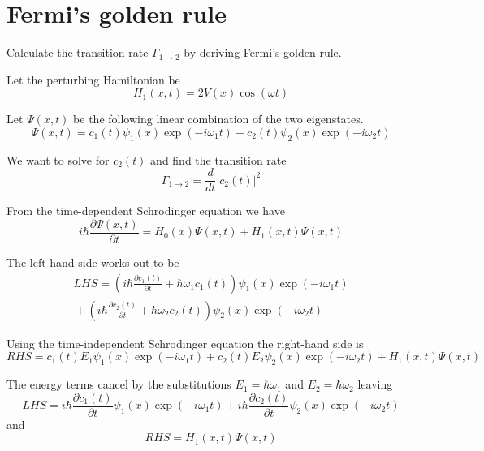 \documentclass[12pt]{article}
\begin{document}
\section*{Fermi's golden rule}

Calculate the transition rate $\Gamma_{1\rightarrow2}$
by deriving Fermi's golden rule.

\bigskip

Let the perturbing Hamiltonian be
\begin{equation*}
H_1(x,t)=2V(x)\cos(\omega t)
\end{equation*}

Let $\Psi(x,t)$ be the following linear combination of the two eigenstates.
\begin{equation*}
\Psi(x,t)=c_1(t)\psi_1(x)\exp(-i\omega_1t)+c_2(t)\psi_2(x)\exp(-i\omega_2t)
\end{equation*}

We want to solve for $c_2(t)$ and find the transition rate
\begin{equation*}
\Gamma_{1\rightarrow2}=\frac{d}{dt}|c_2(t)|^2
\end{equation*}

From the time-dependent Schrodinger equation we have
\begin{equation*}
i\hbar\frac{\partial\Psi(x,t)}{\partial t}=H_0(x)\Psi(x,t)+H_1(x,t)\Psi(x,t)
\end{equation*}

The left-hand side works out to be
\begin{multline*}
LHS=\left(i\hbar\frac{\partial c_1(t)}{\partial t}+\hbar\omega_1c_1(t)\right)
\psi_1(x)\exp(-i\omega_1t)
\\
{}+\left(i\hbar\frac{\partial c_2(t)}{\partial t}+\hbar\omega_2c_2(t)\right)
\psi_2(x)\exp(-i\omega_2t)
\end{multline*}

Using the time-independent Schrodinger equation the right-hand side is
\begin{equation*}
RHS=c_1(t)E_1\psi_1(x)\exp(-i\omega_1t)
+c_2(t)E_2\psi_2(x)\exp(-i\omega_2t)+H_1(x,t)\Psi(x,t)
\end{equation*}

The energy terms cancel by the substitutions
$E_1=\hbar\omega_1$ and $E_2=\hbar\omega_2$ leaving
\begin{equation*}
LHS=i\hbar\frac{\partial c_1(t)}{\partial t}\psi_1(x)\exp(-i\omega_1t)
+i\hbar\frac{\partial c_2(t)}{\partial t}\psi_2(x)\exp(-i\omega_2t)
\end{equation*}
%
and
\begin{equation*}
RHS=H_1(x,t)\Psi(x,t)
\end{equation*}
\end{document}
